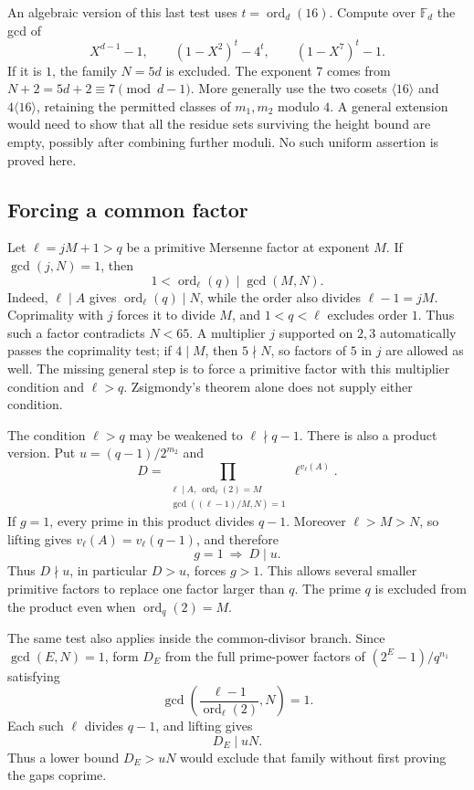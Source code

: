 \documentclass[11pt]{article}
\begin{document}
An algebraic version of this last test uses $t=\operatorname{ord}_d(16)$.
Compute over $\mathbb F_d$ the gcd of
\[
X^{d-1}-1,\qquad (1-X^2)^t-4^t,\qquad (1-X^7)^t-1.
\]
If it is $1$, the family $N=5d$ is excluded. The exponent $7$ comes
from $N+2=5d+2\equiv7\pmod{d-1}$.
More generally use the two cosets $\langle16\rangle$ and
$4\langle16\rangle$, retaining the permitted classes of $m_1,m_2$
modulo $4$. A general extension would need to show that all the
residue sets surviving the height bound are empty, possibly after
combining further moduli. No such uniform assertion is proved here.

\subsection{Forcing a common factor}
\label{sec:forcing-common-factor}
Let $\ell=jM+1>q$ be a primitive Mersenne factor at exponent $M$.
If $\gcd(j,N)=1$, then
\[
1<\operatorname{ord}_\ell(q)\mid\gcd(M,N).
\]
Indeed, $\ell\mid A$ gives $\operatorname{ord}_\ell(q)\mid N$,
while the order also divides $\ell-1=jM$. Coprimality with $j$
forces it to divide $M$, and $1<q<\ell$ excludes order $1$.
Thus such a factor contradicts $N<65$. A multiplier $j$ supported
on $2,3$ automatically passes the coprimality test; if $4\mid M$,
then $5\nmid N$, so factors of $5$ in $j$ are allowed as well.
The missing general step is to force a primitive factor with this
multiplier condition and $\ell>q$. Zsigmondy's theorem alone does
not supply either condition.

The condition $\ell>q$ may be weakened to $\ell\nmid q-1$.
There is also a product version. Put $u=(q-1)/2^{m_2}$ and
\[
D=\prod_{\substack{\ell\mid A,\ \operatorname{ord}_\ell(2)=M\\
                    \gcd((\ell-1)/M,N)=1}}
       \ell^{v_\ell(A)}.
\]
If $g=1$, every prime in this product divides $q-1$.
Moreover $\ell>M>N$, so lifting gives
$v_\ell(A)=v_\ell(q-1)$, and therefore
\[
\boxed{g=1\ \Longrightarrow\ D\mid u.}
\]
Thus $D\nmid u$, in particular $D>u$, forces $g>1$.
This allows several smaller primitive factors to replace one factor
larger than $q$. The prime $q$ is excluded from the product even when
$\operatorname{ord}_q(2)=M$.

The same test also applies inside the common-divisor branch.
Since $\gcd(E,N)=1$, form $D_E$ from the full prime-power factors
of $(2^E-1)/q^{n_1}$ satisfying
\[
\gcd\left(\frac{\ell-1}{\operatorname{ord}_\ell(2)},N\right)=1.
\]
Each such $\ell$ divides $q-1$, and lifting gives
\[
\boxed{D_E\mid uN.}
\]
Thus a lower bound $D_E>uN$ would exclude that family without
first proving the gaps coprime.
\end{document}
